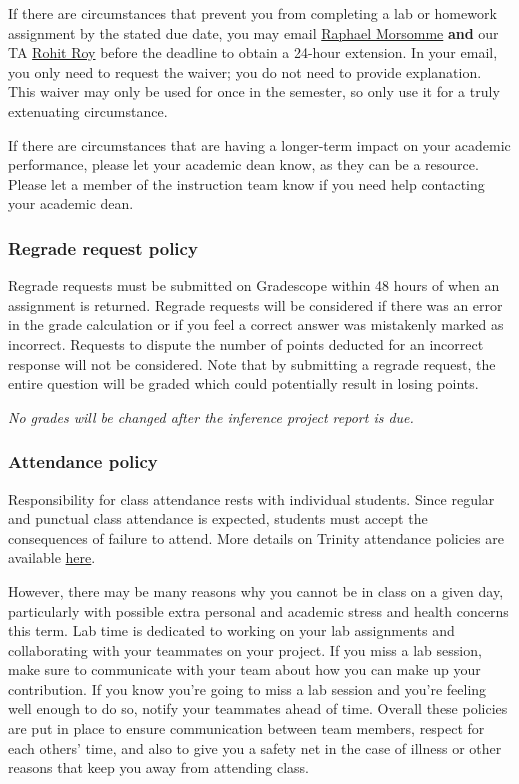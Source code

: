 \documentclass[
  letterpaper,
  DIV=11,
  numbers=noendperiod]{scrartcl}
\begin{document}
If there are circumstances that prevent you from completing a lab or
homework assignment by the stated due date, you may email
\href{mailto:raphael.morsomme@duke.edu}{Raphael Morsomme} \textbf{and}
our TA \href{mailto:rohit.roy@duke.edu}{Rohit Roy} before the deadline
to obtain a 24-hour extension. In your email, you only need to request
the waiver; you do not need to provide explanation. This waiver may only
be used for once in the semester, so only use it for a truly extenuating
circumstance.

If there are circumstances that are having a longer-term impact on your
academic performance, please let your academic dean know, as they can be
a resource. Please let a member of the instruction team know if you need
help contacting your academic dean.

\hypertarget{regrade-request-policy}{%
\subsubsection{Regrade request policy}\label{regrade-request-policy}}

Regrade requests must be submitted on Gradescope within 48 hours of when
an assignment is returned. Regrade requests will be considered if there
was an error in the grade calculation or if you feel a correct answer
was mistakenly marked as incorrect. Requests to dispute the number of
points deducted for an incorrect response will not be considered. Note
that by submitting a regrade request, the entire question will be graded
which could potentially result in losing points.

\emph{No grades will be changed after the inference project report is
due.}

\hypertarget{attendance-policy}{%
\subsubsection{Attendance policy}\label{attendance-policy}}

Responsibility for class attendance rests with individual students.
Since regular and punctual class attendance is expected, students must
accept the consequences of failure to attend. More details on Trinity
attendance policies are available
\href{https://trinity.duke.edu/undergraduate/academic-policies/class-attendance-and-missed-work}{here}.

However, there may be many reasons why you cannot be in class on a given
day, particularly with possible extra personal and academic stress and
health concerns this term. Lab time is dedicated to working on your lab
assignments and collaborating with your teammates on your project. If
you miss a lab session, make sure to communicate with your team about
how you can make up your contribution. If you know you're going to miss
a lab session and you're feeling well enough to do so, notify your
teammates ahead of time. Overall these policies are put in place to
ensure communication between team members, respect for each others'
time, and also to give you a safety net in the case of illness or other
reasons that keep you away from attending class.
\end{document}
